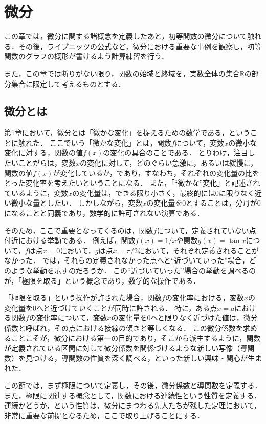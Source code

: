 \chapter{微分}
この章では，微分に関する諸概念を定義したあと，初等関数の微分について触れる．その後，ライプニッツの公式など，微分における重要な事例を観察し，初等関数のグラフの概形が書けるよう計算練習を行う．

また，この章では断りがない限り，関数の始域と終域を，実数全体の集合$\mathbb{R}$の部分集合に限定して考えるものとする．

\section{微分とは}
第1章において，微分とは「微かな変化」を捉えるための数学である，ということに触れた．
ここでいう「微かな変化」とは，関数$f$について，変数$x$の微小な変化に対する，関数の値$f(x)$の変化の具合のことである．
とりわけ，注目したいことがらは，変数$x$の変化に対して，どのぐらい急激に，あるいは緩慢に，関数の値$f(x)$が変化しているか，であり，すなわち，それぞれの変化量の比をとった変化率を考えたいということになる．
また，「``微かな''変化」と記述されているように，変数$x$の変化量は，できる限り小さく，最終的には0に限りなく近い微小な量としたい．
しかしながら，変数$x$の変化量を0とすることは，分母が0になることと同義であり，数学的に許可されない演算である．

そのため，ここで重要となってくるのは，関数$f$について，定義されていない点付近における挙動である．
例えば，関数$f(x) = 1/x$や関数$g(x) = \tan x$について，$f$は点$x = 0$において，$g$は点$x = \pi/2$において，それぞれ定義されることがなかった．
では，それらの定義されなかった点へと``近づいていった''場合，どのような挙動を示すのだろうか．
この``近づいていった''場合の挙動を調べるのが，「極限を取る」という概念であり，数学的な操作である．

「極限を取る」という操作が許された場合，関数$f$の変化率における，変数$x$の変化量を0へと近づけていくことが同時に許される．
特に，ある点$x = a$における関数$f$の変化率について，変数$x$の変化量を0へと限りなく近づけた値は，微分係数と呼ばれ，その点における接線の傾きと等しくなる．
この微分係数を求めることこそが，微分における第一の目的であり，そこから派生するように，関数が定義されている区間に対して微分係数を関係づけるような新しい写像（導関数）を見つける，導関数の性質を深く調べる，といった新しい興味・関心が生まれた．

この節では，まず極限について定義し，その後，微分係数と導関数を定義する．また，極限に関連する概念として，関数における連続性という性質を定義する．連続かどうか，という性質は，微分にまつわる先人たちが残した定理において，非常に重要な前提となるため，ここで取り上げることにする．

